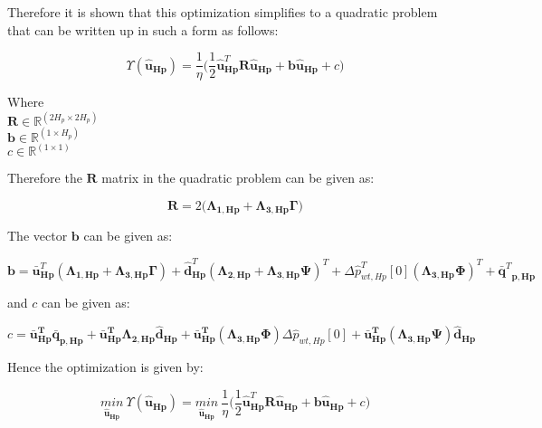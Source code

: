 Therefore it is shown that this optimization simplifies to a quadratic problem that can be written up in such a form as follows:

\begin{equation}
  \Upsilon({\bm{\hat{u}}}_{\bm{{Hp}}}) = \frac{1}{\eta}\Big( \frac{1}{2} \bm{\hat{u}}_{\bm{Hp}}^{T} \bm{R} \bm{\hat{u}}_{\bm{Hp}} + \bm{b} \bm{\hat{u}}_{\bm{Hp}} + c \Big)
\end{equation}

\begin{minipage}[t]{0.28\textwidth}
Where\\
\hspace*{8mm} $\bm{R} \in \pmb{\mathbb{R}}^{(2 H_p \times 2 H_p)} $ \\
\hspace*{8mm} $\bm{b} \in \pmb{\mathbb{R}}^{(1 \times H_p)} $ \\
\hspace*{8mm} $c \in \mathbb{R}^{(1 \times 1)} $
\end{minipage}

Therefore the $\bm{R}$ matrix in the quadratic problem can be given as:

\begin{equation}
  \bm{R} = 2\Big(\bm{\Lambda}_{\bm{1,Hp}} + \bm{\Lambda}_{\bm{3,Hp}} \bm{\Gamma}\Big) 
  \label{R_quadratic}
\end{equation}

The vector $\bm{b}$ can be given as:

\begin{equation}
\!\! \bm{b} = \bm{\bar{u}}_{\bm{Hp}}^{T}(\bm{\Lambda}_{\bm{1,Hp}} \!+ \!\bm{\Lambda}_{\bm{3,Hp}} \bm{\Gamma} )\! + \!\bm{\hat{d}}_{\bm{Hp}}^{T}(\bm{\Lambda}_{\bm{2,Hp}}\! + \!\bm{\Lambda}_{\bm{3,Hp}} \bm{\Psi} )^{T}
  + \Delta \hat{p}_{wt,Hp}^{T}[0] (\bm{\Lambda}_{\bm{3,Hp}} \bm{\Phi})^{T} + {\bm{\bar{q}}^{T}}_{\bm{p,Hp}}
\end{equation}

and $c$ can be given as:

\begin{equation}
\!\! c = \bm{\bar{u}_{Hp}^T} \bm{\bar{q}_{p,Hp}} + \bm{\bar{u}_{Hp}^T} \bm{\Lambda}_{\bm{2,Hp}} \bm{\hat{d}}_{\bm{Hp}} +  \bm{\bar{u}_{Hp}^T} (\bm{\Lambda}_{\bm{3,Hp}} \bm{\Phi}) \Delta \hat{p}_{wt,Hp}[0] + \bm{\bar{u}_{Hp}^T} (\bm{\Lambda}_{\bm{3,Hp}} \bm{\Psi})  \bm{\hat{d}_{Hp}}
\end{equation}

Hence the optimization is given by:

\begin{equation}
\underset{\bm{\hat{u}_{Hp}}}{min} \:  \Upsilon({\bm{\hat{u}}}_{\bm{{Hp}}}) = \underset{\bm{\hat{u}_{Hp}}}{min} \:  \frac{1}{\eta}\bigg( \frac{1}{2} \bm{\hat{u}}_{\bm{Hp}}^{T} \bm{R} \bm{\hat{u}}_{\bm{Hp}} + \bm{b} \bm{\hat{u}}_{\bm{Hp}} + c \bigg)
\label{eq:obj_final}
\end{equation}